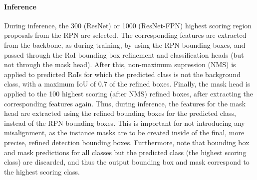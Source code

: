 \paragraph{Inference}
During inference, the 300 (ResNet) or 1000 (ResNet-FPN) highest scoring region proposals
from the RPN are selected. The corresponding features are extracted from the backbone, as during training, by using the RPN bounding boxes,
and passed through the RoI bounding box refinement and classification heads
(but not through the mask head).
After this, non-maximum supression (NMS) is applied to predicted RoIs for which the predicted class is not the background class,
with a maximum IoU of 0.7 of the refined boxes.
Finally, the mask head is applied to the 100 highest scoring (after NMS) refined boxes,
after extracting the corresponding features again.
Thus, during inference, the features for the mask head are extracted using the refined
bounding boxes for the predicted class, instead of the RPN bounding boxes. This is important for not
introducing any misalignment, as the instance masks are to be created inside of the
final, more precise, refined detection bounding boxes.
Furthermore, note that bounding box and mask predictions for all classes but the predicted
class (the highest scoring class) are discarded, and thus the output bounding
box and mask correspond to the highest scoring class.
